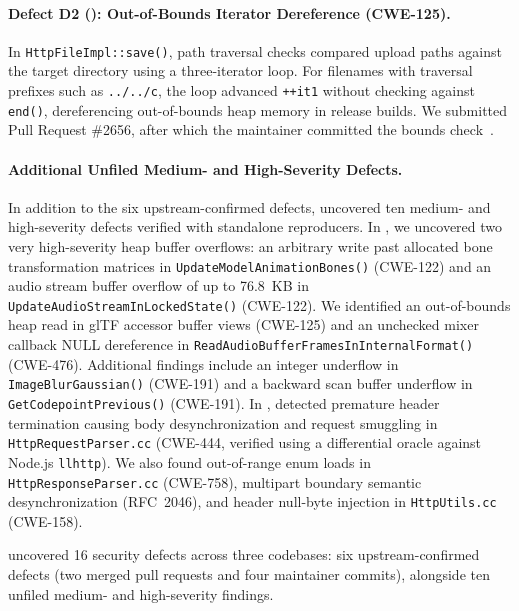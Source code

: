 \paragraph{Defect D2 (\drogon): Out-of-Bounds Iterator Dereference (CWE-125).}
In \texttt{HttpFileImpl::}\allowbreak\texttt{save()}, path traversal checks compared upload paths against the target directory using a three-iterator loop.
For filenames with traversal prefixes such as \texttt{../../c}, the loop advanced \texttt{++it1} without checking against \texttt{end()}, dereferencing out-of-bounds heap memory in release builds.
We submitted Pull Request \#2656, after which the maintainer committed the bounds check~\cite{drogon_pr2656}.

\paragraph{Additional Unfiled Medium- and High-Severity Defects.}
In addition to the six upstream-confirmed defects, \tool uncovered ten medium- and high-severity defects verified with standalone reproducers.
In \raylib, we uncovered two very high-severity heap buffer overflows: an arbitrary write past allocated bone transformation matrices in \texttt{UpdateModelAnimationBones()} (CWE-122) and an audio stream buffer overflow of up to 76.8~KB in \texttt{UpdateAudioStreamInLockedState()} (CWE-122).
We identified an out-of-bounds heap read in glTF accessor buffer views (CWE-125) and an unchecked mixer callback NULL dereference in \texttt{ReadAudioBufferFramesInInternalFormat()} (CWE-476).
Additional findings include an integer underflow in \texttt{ImageBlurGaussian()} (CWE-191) and a backward scan buffer underflow in \texttt{GetCodepointPrevious()} (CWE-191).
In \drogon, \tool detected premature header termination causing body desynchronization and request smuggling in \texttt{HttpRequestParser.cc} (CWE-444, verified using a differential oracle against Node.js \texttt{llhttp}).
We also found out-of-range enum loads in \texttt{HttpResponseParser.cc} (CWE-758), multipart boundary semantic desynchronization (RFC~2046), and header null-byte injection in \texttt{HttpUtils.cc} (CWE-158).

\begin{observation}
\label{obs:bugs}
\tool uncovered 16 security defects across three codebases: six upstream-confirmed defects (two merged pull requests and four maintainer commits), alongside ten unfiled medium- and high-severity findings.
\end{observation}


